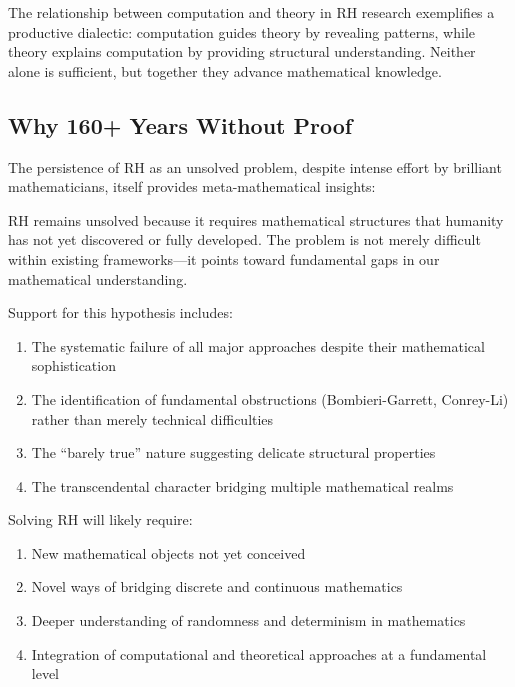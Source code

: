 \begin{insight}
The relationship between computation and theory in RH research exemplifies a productive dialectic: computation guides theory by revealing patterns, while theory explains computation by providing structural understanding. Neither alone is sufficient, but together they advance mathematical knowledge.
\end{insight}

\subsection{Why 160+ Years Without Proof}
\label{subsec:why_no_proof}

The persistence of RH as an unsolved problem, despite intense effort by brilliant mathematicians, itself provides meta-mathematical insights:

\begin{hypothesis}
RH remains unsolved because it requires mathematical structures that humanity has not yet discovered or fully developed. The problem is not merely difficult within existing frameworks—it points toward fundamental gaps in our mathematical understanding.
\end{hypothesis}

\begin{evidence}
Support for this hypothesis includes:
\begin{enumerate}
\item The systematic failure of all major approaches despite their mathematical sophistication
\item The identification of fundamental obstructions (Bombieri-Garrett, Conrey-Li) rather than merely technical difficulties
\item The ``barely true'' nature suggesting delicate structural properties
\item The transcendental character bridging multiple mathematical realms
\end{enumerate}
\end{evidence}

\begin{prediction}
Solving RH will likely require:
\begin{enumerate}
\item New mathematical objects not yet conceived
\item Novel ways of bridging discrete and continuous mathematics
\item Deeper understanding of randomness and determinism in mathematics
\item Integration of computational and theoretical approaches at a fundamental level
\end{enumerate}
\end{prediction}

